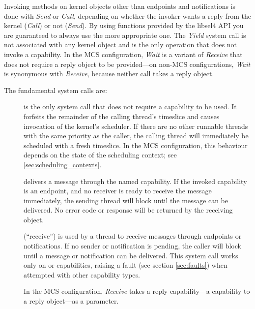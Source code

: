 Invoking methods on kernel objects other than endpoints and notifications is
done with \emph{Send} or \emph{Call}, depending on whether the invoker
wants a reply from the kernel (\emph{Call}) or not (\emph{Send}).  By using
functions provided by the libsel4 API you are guaranteed to always use the more
appropriate one.  The \emph{Yield} system call is not associated with any kernel
object and is the only operation that does not invoke a capability.  In the MCS
configuration, \emph{Wait} is a variant of \emph{Receive} that does not require
a reply object to be provided---on non-MCS configurations, \emph{Wait} is
synonymous with \emph{Receive}, because neither call takes a reply object.

The fundamental system calls are:
\begin{description}
    \item[] is the only system call that does
    not require a capability to be used.  It forfeits the remainder of the
    calling thread's timeslice and causes invocation of the kernel's scheduler.
    If there are no other runnable threads with the same priority as the caller,
    the calling thread will immediately be scheduled with a fresh timeslice.  In
    the MCS configuration, this behaviour depends on the state of the scheduling
    context; see \autoref{sec:scheduling_contexts}.

    \item[] delivers a message through the named
    capability.  If the invoked capability is an endpoint, and no receiver is
    ready to receive the message immediately, the sending thread will block
    until the message can be delivered.  No error code or response will be
    returned by the receiving object.

    \item[] (``receive'') is used by a thread to
    receive messages through endpoints or notifications.  If no sender or
    notification is pending, the caller will block until a message or
    notification can be delivered.  This system call works only on
     or  capabilities, raising a fault (see
    section \ref{sec:faults}) when attempted with other capability types.

    In the MCS configuration, \emph{Receive} takes a reply capability---a
    capability to a reply object---as a parameter.
\end{description}

